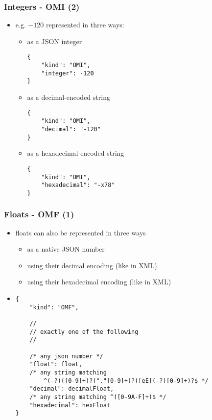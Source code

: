\documentclass[usenames,dvipsnames]{beamer}
\begin{document}
\begin{frame}[fragile]
    \frametitle{Integers - OMI (2)}
    \begin{itemize}
    \item e.g. $-120$ represented in three ways:
    \begin{itemize}
        \item as a JSON integer
\begin{lstlisting}
{
    "kind": "OMI",
    "integer": -120
}
\end{lstlisting}
        \item as a decimal-encoded string
\begin{lstlisting}
{
    "kind": "OMI",
    "decimal": "-120"
}
\end{lstlisting}
        \item as a hexadecimal-encoded string
\begin{lstlisting}
{
    "kind": "OMI",
    "hexadecimal": "-x78"
}
\end{lstlisting}
        \end{itemize}
    \end{itemize}
\end{frame}

\begin{frame}[fragile]
    \frametitle{Floats - OMF (1)}
    \begin{itemize}
        \item floats can also be represented in three ways
        \begin{itemize}
            \item as a native JSON number
            \item using their decimal encoding (like in XML)
            \item using their hexadecimal encoding (like in XML)
        \end{itemize}
        \item
\begin{lstlisting}
{
    "kind": "OMF",

    //
    // exactly one of the following
    //

    /* any json number */
    "float": float,
    /* any string matching 
        ^(-?)([0-9]+)?("."[0-9]+)?([eE](-?)[0-9]+)?$ */
    "decimal": decimalFloat,
    /* any string matching ^([0-9A-F]+)$ */
    "hexadecimal": hexFloat 
}
\end{lstlisting}
    \end{itemize}
\end{frame}
\end{document}

